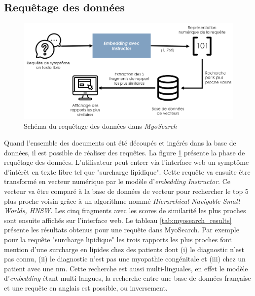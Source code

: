 \subsection{Requêtage des données}
\begin{figure}[htbp]
 \centering
 \includegraphics[width=1\textwidth]{figures/myosearch_query.png}
 \caption[Requêtage des données dans \textit{MyoSearch}]{Schéma du requêtage des données dans \textit{MyoSearch}}
 \label{fig:myosearch_query}
\end{figure}
Quand l'ensemble des documents ont été découpés et ingérés dans la base de données, il est possible de réaliser des requêtes. La figure \ref{fig:myosearch_query} présente la phase de requêtage des données. L'utilisateur peut entrer via l'interface web un symptôme d'intérêt en texte libre tel que "surcharge lipidique". Cette requête va ensuite être transformé en vecteur numérique par le modèle d'\textit{embedding }\textit{Instructor}. Ce vecteur va être comparé à la base de données de vecteur pour rechercher le top 5 plus proche voisin grâce à un algorithme nommé \textit{Hierarchical Navigable Small Worlds, HNSW}. Les cinq fragments avec les scores de similarité les plus proches sont ensuite affichés sur l'interface web. Le tableau \ref{tab:myosearch_results} présente les résultats obtenus pour une requête dans MyoSearch. Par exemple pour la requête "surcharge lipidique" les trois rapports les plus proches font mention d'une surcharge en lipides chez des patients dont (i) le diagnostic n'est pas connu, (ii) le diagnostic n'est pas une myopathie congénitale et (iii) chez un patient avec une \gls{nm}. Cette recherche est aussi multi-linguales, en effet le modèle d'\textit{embedding} étant multi-langues, la recherche entre une base de données française et une requête en anglais est possible, ou inversement.
